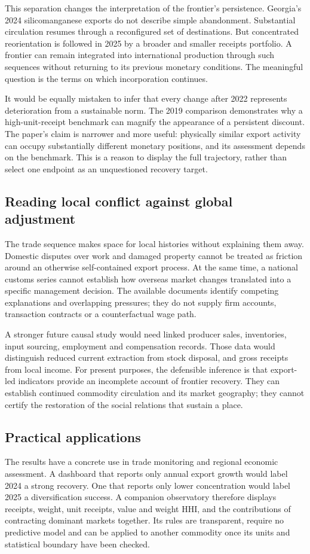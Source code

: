 \documentclass[11pt,a4paper]{article}
\begin{document}
This separation changes the interpretation of the frontier's persistence. Georgia's 2024 silicomanganese exports do not describe simple abandonment. Substantial circulation resumes through a reconfigured set of destinations. But concentrated reorientation is followed in 2025 by a broader and smaller receipts portfolio. A frontier can remain integrated into international production through such sequences without returning to its previous monetary conditions. The meaningful question is the terms on which incorporation continues.

It would be equally mistaken to infer that every change after 2022 represents deterioration from a sustainable norm. The 2019 comparison demonstrates why a high-unit-receipt benchmark can magnify the appearance of a persistent discount. The paper's claim is narrower and more useful: physically similar export activity can occupy substantially different monetary positions, and its assessment depends on the benchmark. This is a reason to display the full trajectory, rather than select one endpoint as an unquestioned recovery target.

\subsection{Reading local conflict against global adjustment}
The trade sequence makes space for local histories without explaining them away. Domestic disputes over work and damaged property cannot be treated as friction around an otherwise self-contained export process. At the same time, a national customs series cannot establish how overseas market changes translated into a specific management decision. The available documents identify competing explanations and overlapping pressures; they do not supply firm accounts, transaction contracts or a counterfactual wage path.

A stronger future causal study would need linked producer sales, inventories, input sourcing, employment and compensation records. Those data would distinguish reduced current extraction from stock disposal, and gross receipts from local income. For present purposes, the defensible inference is that export-led indicators provide an incomplete account of frontier recovery. They can establish continued commodity circulation and its market geography; they cannot certify the restoration of the social relations that sustain a place.

\subsection{Practical applications}
The results have a concrete use in trade monitoring and regional economic assessment. A dashboard that reports only annual export growth would label 2024 a strong recovery. One that reports only lower concentration would label 2025 a diversification success. A companion observatory therefore displays receipts, weight, unit receipts, value and weight HHI, and the contributions of contracting dominant markets together. Its rules are transparent, require no predictive model and can be applied to another commodity once its units and statistical boundary have been checked.
\end{document}
